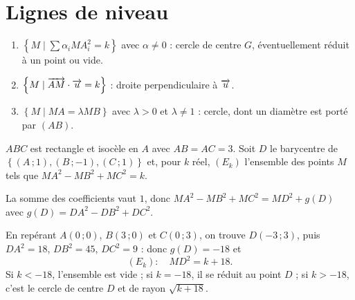\section{Lignes de niveau}

\begin{propriete}
\begin{enumerate}[label=\textbf{\arabic*.}, leftmargin=*, itemsep=0.15em]
  \item $\left\{M \mid \sum \alpha_{i}MA_{i}^{2} = k\right\}$ avec
        $\alpha \neq 0$ : cercle de centre $G$, éventuellement réduit à un
        point ou vide.
  \item $\left\{M \mid \overrightarrow{AM} \cdot \overrightarrow{u} = k\right\}$ : droite
        perpendiculaire à $\overrightarrow{u}$.
  \item $\left\{M \mid MA = \lambda MB\right\}$ avec $\lambda>0$ et
        $\lambda \neq 1$ : cercle, dont un diamètre est porté par $(AB)$.
\end{enumerate}
\end{propriete}

\begin{exemple}
$ABC$ est rectangle et isocèle en $A$ avec $AB = AC = 3$. Soit $D$ le
barycentre de $\left\{(A\,;1),(B\,;-1),(C\,;1)\right\}$ et, pour $k$ réel,
$(E_{k})$ l'ensemble des points $M$ tels que
$MA^{2}-MB^{2}+MC^{2} = k$.

La somme des coefficients vaut $1$, donc
$MA^{2}-MB^{2}+MC^{2} = MD^{2}+g(D)$ avec
$g(D) = DA^{2}-DB^{2}+DC^{2}$.

En repérant $A(0\,;0)$, $B(3\,;0)$ et $C(0\,;3)$, on trouve $D(-3\,;3)$, puis
$DA^{2} = 18$, $DB^{2} = 45$, $DC^{2} = 9$ : donc $g(D) = -18$ et
\[
  (E_{k}) : \quad MD^{2} = k+18 .
\]
Si $k<-18$, l'ensemble est vide ; si $k = -18$, il se réduit au point $D$ ;
si $k>-18$, c'est le cercle de centre $D$ et de rayon $\sqrt{k+18}$.
\end{exemple}

